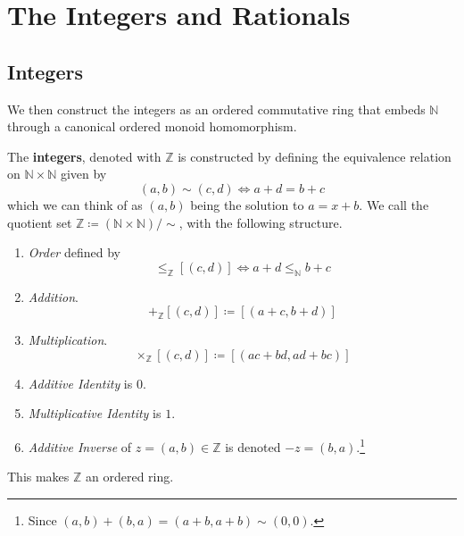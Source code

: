 \section{The Integers and Rationals}

\subsection{Integers} 

  We then construct the integers as an ordered commutative ring that embeds $\mathbb{N}$ through a canonical ordered monoid homomorphism.  

  \begin{definition}[Integers]
    The \textbf{integers}, denoted with $\mathbb{Z}$ is constructed by defining the equivalence relation on $\mathbb{N} \times \mathbb{N}$ given by 
    \begin{equation}
      (a, b) \sim (c, d) \iff a + d = b + c
    \end{equation}
    which we can think of as $(a, b)$ being the solution to $a = x + b$. We call the quotient set $\mathbb{Z} \coloneqq (\mathbb{N} \times \mathbb{N})/{\sim}$, with the following structure. 
    \begin{enumerate}
      \item \textit{Order} defined by 
        \begin{equation} 
          [(a, b)] \leq_\mathbb{Z} [(c, d)] \iff a + d \leq_\mathbb{N} b + c 
        \end{equation}
      \item \textit{Addition}. 
        \begin{equation}
          [(a, b)] +_{\mathbb{Z}} [(c, d)] \coloneqq [(a + c, b + d)] 
        \end{equation}
      \item \textit{Multiplication}. 
        \begin{equation}
          [(a, b)] \times_{\mathbb{Z}} [(c, d)] \coloneqq [(ac + bd, ad + bc)] 
        \end{equation}

      \item \textit{Additive Identity} is $0$. 
      \item \textit{Multiplicative Identity} is $1$. 
      \item \textit{Additive Inverse} of $z = (a, b) \in \mathbb{Z}$ is denoted $-z = (b, a)$.\footnote{Since $(a, b) + (b, a) = (a + b, a + b) \sim (0, 0)$.}
    \end{enumerate}
    This makes $\mathbb{Z}$ an ordered ring. 
  \end{definition} 
  
